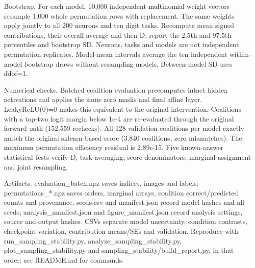 \documentclass[10pt,a4paper]{article}
\begin{document}
Bootstrap. For each model, 10,000 independent multinomial weight vectors resample 1,000 whole permutation rows with replacement. The same weights apply jointly to all 200 neurons and ten digit tasks. Recompute mean signed contributions, their overall average and then D; report the 2.5th and 97.5th percentiles and bootstrap SD. Neurons, tasks and models are not independent permutation replicates. Model-mean intervals average the ten independent within-model bootstrap draws without resampling models. Between-model SD uses ddof=1.

Numerical checks. Batched coalition evaluation precomputes intact hidden activations and applies the same zero masks and final affine layer. LeakyReLU(0)=0 makes this equivalent to the original intervention. Coalitions with a top-two logit margin below 1e-4 are re-evaluated through the original forward path (152,559 rechecks). All 128 validation coalitions per model exactly match the original sklearn-based score (3,840 coalitions, zero mismatches). The maximum permutation efficiency residual is 2.89e-15. Five known-answer statistical tests verify D, task averaging, score denominators, marginal assignment and joint resampling.

Artifacts. evaluation\_batch.npz saves indices, images and labels; permutations\_*.npz saves orders, marginal arrays, coalition correct/predicted counts and provenance. seeds.csv and manifest.json record model hashes and all seeds; analysis\_manifest.json and figure\_manifest.json record analysis settings, source and output hashes. CSVs separate model uncertainty, condition contrasts, checkpoint variation, contribution means/SEs and validation. Reproduce with run\_sampling\_stability.py, analyze\_sampling\_stability.py, plot\_sampling\_stability.py and sampling\_stability/build\_report.py, in that order; see README.md for commands.
\end{document}
